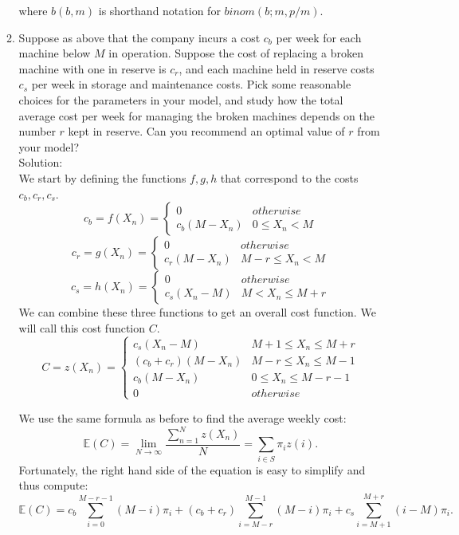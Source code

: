 \documentclass[12pt]{article}
\numberwithin{equation}{section}
\begin{document}
\begin{enumerate}
\begin{enumerate}
                    where $b(b,m)$ is shorthand notation for $binom(b;m,p/m)$.

                    \item Suppose as above that the company incurs a cost $c_b$ per week for each machine below $M$ in operation. Suppose the cost of replacing a broken machine with one in reserve is $c_r$, and each machine held in reserve costs $c_s$ per week in storage and maintenance costs. Pick some reasonable choices for the parameters in your model, and study how the total average cost per week for managing the broken machines depends on the number $r$ kept in reserve. Can you recommend an optimal value of $r$ from your model?\\

                        Solution:\\

                        We start by defining the functions $f,g,h$ that correspond to the costs $c_b,c_r,c_s$.
                        $$c_b=f(X_n)=\left\{\begin{array}{cc}0&otherwise\\c_b(M-X_n)&0\leq X_n<M\end{array}\right.$$
                        $$c_r=g(X_n)=\left\{\begin{array}{cc}0&otherwise\\c_r(M-X_n)&M-r\leq X_n<M\end{array}\right.$$
                        $$c_s=h(X_n)=\left\{\begin{array}{cc}0&otherwise\\c_s(X_n-M)&M<X_n\leq M+r\end{array}\right.$$
                        We can combine these three functions to get an overall cost function. We will call this cost function $C$.
                        $$C=z(X_n)=\left\{\begin{array}{cc}c_s(X_n-M)&M+1\leq X_n\leq M+r\\(c_b+c_r)(M-X_n)&M-r\leq X_n\leq M-1\\c_b(M-X_n)&0\leq X_n\leq M-r-1\\0&otherwise\end{array}\right.$$

                        We use the same formula as before to find the average weekly cost:
                        $$\mathbb{E}(C)=\lim_{N\to\infty}\frac{\sum_{n=1}^Nz(X_n)}{N}=\sum_{i\in S}\pi_iz(i).$$
                        Fortunately, the right hand side of the equation is easy to simplify and thus compute:
                        $$\mathbb{E}(C)=c_b\sum_{i=0}^{M-r-1}(M-i)\pi_i+(c_b+c_r)\sum_{i=M-r}^{M-1}(M-i)\pi_i+c_s\sum_{i=M+1}^{M+r}(i-M)\pi_i.$$


\end{enumerate}
\end{enumerate}
\end{document}
